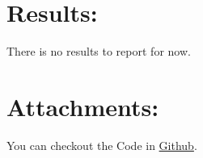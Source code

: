 \documentclass[a4paper, 11pt]{article}
\begin{document}
	\section*{Results:}
	There is no results to report for now.
	
	\section*{Attachments:}
	
	You can checkout the Code in \href{https://github.com/Ethiy/3DSceneModel}{Github}.
	
	
	
\end{document}
